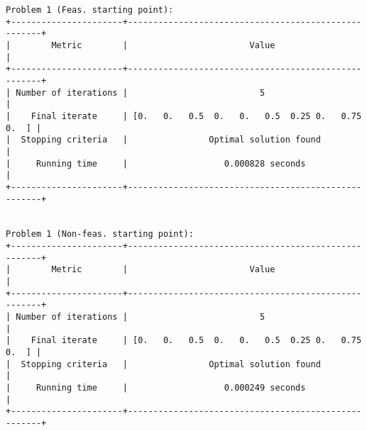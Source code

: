 \documentclass{article}
\begin{document}
\begin{verbatim}
Problem 1 (Feas. starting point):
+----------------------+-----------------------------------------------------+
|        Metric        |                        Value                        |
+----------------------+-----------------------------------------------------+
| Number of iterations |                          5                          |
|    Final iterate     | [0.   0.   0.5  0.   0.   0.5  0.25 0.   0.75 0.  ] |
|  Stopping criteria   |                Optimal solution found               |
|     Running time     |                   0.000828 seconds                  |
+----------------------+-----------------------------------------------------+


Problem 1 (Non-feas. starting point):
+----------------------+-----------------------------------------------------+
|        Metric        |                        Value                        |
+----------------------+-----------------------------------------------------+
| Number of iterations |                          5                          |
|    Final iterate     | [0.   0.   0.5  0.   0.   0.5  0.25 0.   0.75 0.  ] |
|  Stopping criteria   |                Optimal solution found               |
|     Running time     |                   0.000249 seconds                  |
+----------------------+-----------------------------------------------------+
\end{verbatim}
\end{document}
